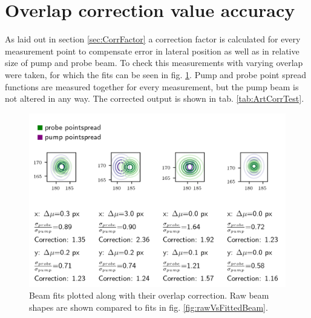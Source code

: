 \documentclass[twoside,openright]{scrreprt}
\begin{document}
\section{Overlap correction value accuracy}
As laid out in section \ref{sec:CorrFactor} a correction factor is calculated for every measurement point to compensate error in lateral position as well as in relative size of pump and probe beam.
To check this measurements with varying overlap were taken, for which the fits can be seen in fig. \ref{fig:correctionComparison}.
Pump and probe point spread functions are measured together for every measurement, but the pump beam is not altered in any way. The corrected output is shown in tab. \ref{tab:ArtCorrTest}. 
\begin{figure}[!h]
\centering
\includegraphics[width=\linewidth]{images/CorrectionComparison.png}
\caption{Beam fits plotted along with their overlap correction. Raw beam shapes are shown compared to fits in fig. \ref{fig:rawVsFittedBeam}.\label{fig:correctionComparison}}
\end{figure}
\end{document}
